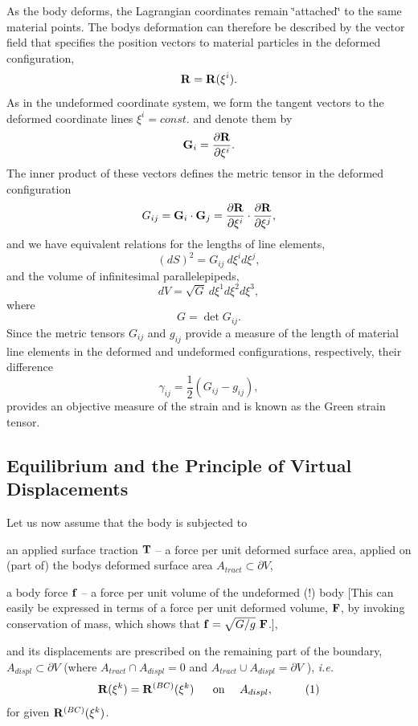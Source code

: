 As the body deforms, the Lagrangian coordinates remain \char`\"{}attached\char`\"{} to the same material points. The body\textquotesingle{}s deformation can therefore be described by the vector field that specifies the position vectors to material particles in the deformed configuration, \[ {\bf R} = {\bf R}(\xi^i). \] As in the undeformed coordinate system, we form the tangent vectors to the deformed coordinate lines $ \xi^i = const.$ and denote them by \[ {\bf G}_i = \frac{\partial {\bf R}}{\partial \xi^i}. \] The inner product of these vectors defines the metric tensor in the deformed configuration \[ G_{ij} = {\bf G}_i \cdot {\bf G}_j = \frac{\partial {\bf R}}{\partial \xi^i} \cdot \frac{\partial {\bf R}}{\partial \xi^j}, \] and we have equivalent relations for the lengths of line elements, \[ (dS)^2 = G_{ij} \ d\xi^i d\xi^j, \] and the volume of infinitesimal parallelepipeds, \[ dV = \sqrt{G} \ d\xi^1 d\xi^2 d\xi^3, \] where \[ G = \det G_{ij}. \] Since the metric tensors $ G_{ij }$ and $ g_{ij }$ provide a measure of the length of material line elements in the deformed and undeformed configurations, respectively, their difference \[ \gamma_{ij} = \frac{1}{2} (G_{ij} - g_{ij}), \] provides an objective measure of the strain and is known as the Green strain tensor.



\hypertarget{index_equilibrium}{}\subsection{Equilibrium and the Principle of Virtual Displacements}\label{index_equilibrium}
Let us now assume that the body is subjected to
\begin{DoxyItemize}
\item an applied surface traction $ {\bf T} $ -- a force per unit deformed surface area, applied on (part of) the body\textquotesingle{}s deformed surface area $ A_{tract} \subset \partial V$,
\item a body force $ {\bf f} $ -- a force per unit volume of the undeformed (!) body \mbox{[}This can easily be expressed in terms of a force per unit deformed volume, $ {\bf F }$, by invoking conservation of mass, which shows that $ {\bf f } = \sqrt{G/g} \ {\bf F }$.\mbox{]},
\end{DoxyItemize}and its displacements are prescribed on the remaining part of the boundary, $ A_{displ} \subset \partial V $ (where $ A_{tract} \cap A_{displ}=0 $ and $A_{tract} \cup A_{displ} = \partial V$ ), {\itshape  i.\+e. } \[ {\bf R}(\xi^k) = {\bf R}^{(BC)}(\xi^k) \mbox{ \ \ \ \ on \ \ \ $ A_{displ},$ } \ \ \ \ \ \ \ \ (1) \] for given $ {\bf R}^{(BC)}(\xi^k) $.

